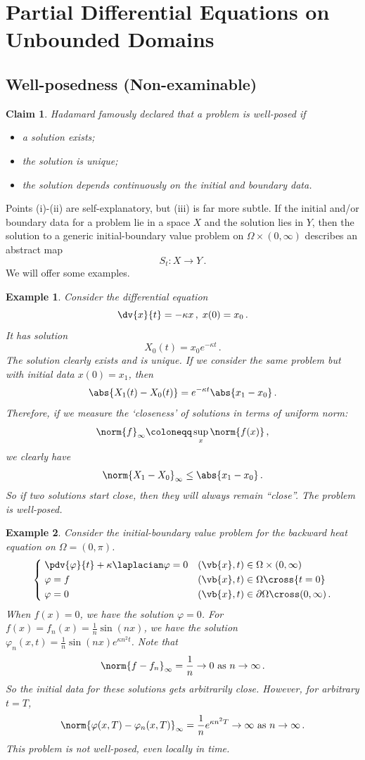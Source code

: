 \documentclass{article}
\theoremstyle{plain}\theoremheaderfont{\normalfont\itshape}\theorembodyfont{\rmfamily}\theoremseparator{.}\newtheorem*{rem}{Remark}\newtheorem*{ex}{Example}\newtheorem*{proof}{Proof}\newtheorem*{altp}{Alternative proof}
\theoremstyle{plain}\theoremheaderfont{\normalfont\bfseries}\theorembodyfont{\rmfamily}\theoremseparator{.}\newtheorem{thm}{Theorem}[section]\newtheorem{lem}[thm]{Lemma}\newtheorem{prop}[thm]{Proposition}\newtheorem*{cor}{Corollary}\newtheorem{defn}[thm]{Definition}\newtheorem{clm}[thm]{Claim}\newtheorem{clminproof}{Claim}
\theoremstyle{break}\theoremheaderfont{\normalfont\itshape}\theorembodyfont{\rmfamily}\theoremseparator{.\medskip}\newtheorem*{proofskip}{Proof}\newtheorem*{exs}{Examples}\newtheorem*{rems}{Remarks}
\theoremstyle{break}\theoremheaderfont{\normalfont\bfseries}\theorembodyfont{\rmfamily}\theoremseparator{.\medskip}\newtheorem{lemskip}[thm]{Lemma}\newtheorem{defnskip}[thm]{Definition}\newtheorem{propskip}[thm]{Proposition}\newtheorem{thmskip}[thm]{Theorem}
\numberwithin{equation}{section}
\begin{document}
	\newpage

	\section{Partial Differential Equations on Unbounded Domains}
	\subsection{Well-posedness (Non-examinable)}
	\begin{clm}
		Hadamard famously declared that a problem is well-posed if
		\begin{itemize}[topsep=0pt]
			\item[(i)] a solution exists;
			\item[(ii)] the solution is unique;
			\item[(iii)] the solution depends continuously on the initial and boundary data.
		\end{itemize}
	\end{clm}
	Points (i)-(ii) are self-explanatory, but (iii) is far more subtle. If the initial and/or boundary data for a problem lie in a space \(X\) and the solution lies in \(Y\), then the solution to a generic initial-boundary value problem on \(\Omega\times(0,\infty)\) describes an abstract map
	\[S_t:X\to Y\,.\]
	We will offer some examples.
	\begin{ex}
		Consider the differential equation
		\[\dv{x}{t}=-\kappa x\,,\;x(0)=x_0\,.\]
		It has solution
		\[X_0(t)=x_0e^{-\kappa t}\,.\]
		The solution clearly exists and is unique. If we consider the same problem but with initial data \(x(0)=x_1\), then
		\[\abs{X_1(t)-X_0(t)}=e^{-\kappa t}\abs{x_1-x_0}\,.\]
		Therefore, if we measure the `closeness' of solutions in terms of \textit{uniform norm}:
		\[\norm{f}_\infty\coloneqq\sup_{x}\norm{f(x)}\,,\]
		we clearly have
		\[\norm{X_1-X_0}_\infty\le\abs{x_1-x_0}\,.\]
		So if two solutions start close, then they will always remain “close”. The problem is well-posed.
	\end{ex}
	\begin{ex}
		Consider the initial-boundary value problem for the backward heat equation on \(\Omega=(0,\pi)\).
		\[\left\{\begin{aligned}
			& \;\pdv{\varphi}{t}+\kappa\laplacian\varphi=0 && (\vb{x},t)\in\Omega\times(0,\infty)\\
			& \;\varphi=f && (\vb{x},t)\in\Omega\cross\{t=0\}\\
			& \;\varphi=0 && (\vb{x},t)\in\partial\Omega\cross(0,\infty)\,.
		\end{aligned}\right.\]
		When \(f(x)=0\), we have the solution \(\varphi=0\). For \(f(x)=f_n(x)=\frac{1}{n}\sin(nx)\), we have the solution \(\varphi_n(x,t)=\frac{1}{n}\sin(nx)e^{\kappa n^2t}\). Note that
		\[\norm{f-f_n}_\infty=\frac{1}{n}\to 0\text{ as }n\to\infty\,.\]
		So the initial data for these solutions gets arbitrarily close. However, for arbitrary \(t=T\),
		\[\norm{\varphi(x,T)-\varphi_n(x,T)}_\infty=\frac{1}{n}e^{\kappa n^2T}\to\infty\text{ as }n\to\infty\,.\]
		This problem is not well-posed, even locally in time.
	\end{ex}
\end{document}
